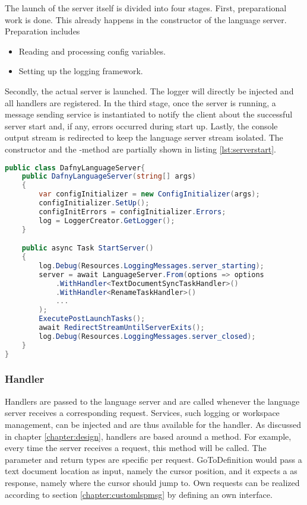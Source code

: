 The launch of the server itself is divided into four stages.
First, preparational work is done.
This already happens in the constructor of the language server.
Preparation includes
\begin{itemize}
    \item Reading and processing config variables.
    \item Setting up the logging framework.
\end{itemize}
Secondly, the actual server is launched.
The logger will directly be injected and all handlers are registered.
In the third stage, once the server is running, a message sending service is instantiated to notify the client about the successful server start and, if any, errors occurred during start up.
Lastly, the console output stream is redirected to keep the language server stream isolated.
The constructor and the -method are partially shown in listing \ref{lst:serverstart}.

\begin{lstlisting}[language=csharp, caption={Starting the Language Server}, captionpos=b, label={lst:serverstart}]
public class DafnyLanguageServer{
    public DafnyLanguageServer(string[] args)
    {
        var configInitializer = new ConfigInitializer(args);
        configInitializer.SetUp();
        configInitErrors = configInitializer.Errors;
        log = LoggerCreator.GetLogger();
    }

    public async Task StartServer()
    {
        log.Debug(Resources.LoggingMessages.server_starting);
        server = await LanguageServer.From(options => options
            .WithHandler<TextDocumentSyncTaskHandler>()
            .WithHandler<RenameTaskHandler>()
            ...
        );
        ExecutePostLaunchTasks();
        await RedirectStreamUntilServerExits();
        log.Debug(Resources.LoggingMessages.server_closed);
    }
}
\end{lstlisting}

\subsubsection{Handler}
Handlers are passed to the language server and are called whenever the language server receives a corresponding request.
Services, such logging or workspace management, can be injected and are thus available for the handler.
As discussed in chapter \ref{chapter:design}, handlers are based around a  method.
For example, every time the server receives a  request, this  method will be called.
The parameter and return types are specific per request.
GoToDefinition would pass a text document location as input, namely the cursor position, and it expects a  as response,
namely where the cursor should jump to.
Own requests can be realized according to section \ref{chapter:customlspmsg} by defining an own interface.\\

